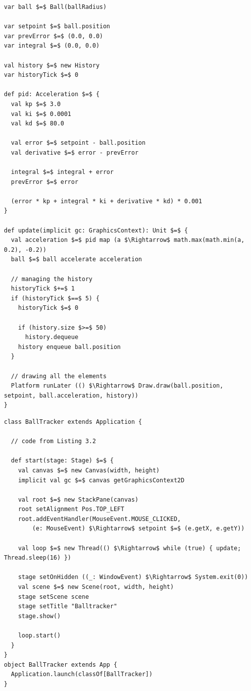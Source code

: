 \begin{minipage}{\linewidth}
\begin{lstlisting}[style=ScalaStyle, caption={Ball drawing}, label={lst:ball-feedback}]
var ball $=$ Ball(ballRadius)

var setpoint $=$ ball.position
var prevError $=$ (0.0, 0.0)
var integral $=$ (0.0, 0.0)

val history $=$ new History
var historyTick $=$ 0

def pid: Acceleration $=$ {
  val kp $=$ 3.0
  val ki $=$ 0.0001
  val kd $=$ 80.0

  val error $=$ setpoint - ball.position
  val derivative $=$ error - prevError

  integral $=$ integral + error
  prevError $=$ error

  (error * kp + integral * ki + derivative * kd) * 0.001
}

def update(implicit gc: GraphicsContext): Unit $=$ {
  val acceleration $=$ pid map (a $\Rightarrow$ math.max(math.min(a, 0.2), -0.2))
  ball $=$ ball accelerate acceleration

  // managing the history
  historyTick $+=$ 1
  if (historyTick $==$ 5) {
    historyTick $=$ 0

    if (history.size $>=$ 50)
      history.dequeue
    history enqueue ball.position
  }

  // drawing all the elements
  Platform runLater (() $\Rightarrow$ Draw.draw(ball.position, setpoint, ball.acceleration, history))
}
\end{lstlisting}
\end{minipage}

\begin{minipage}{\linewidth}
\begin{lstlisting}[style=ScalaStyle, caption={Ball drawing}, label={lst:ball-drawing}]
class BallTracker extends Application {

  // code from Listing 3.2

  def start(stage: Stage) $=$ {
    val canvas $=$ new Canvas(width, height)
    implicit val gc $=$ canvas getGraphicsContext2D

    val root $=$ new StackPane(canvas)
    root setAlignment Pos.TOP_LEFT
    root.addEventHandler(MouseEvent.MOUSE_CLICKED,
        (e: MouseEvent) $\Rightarrow$ setpoint $=$ (e.getX, e.getY))

    val loop $=$ new Thread(() $\Rightarrow$ while (true) { update; Thread.sleep(16) })

    stage setOnHidden ((_: WindowEvent) $\Rightarrow$ System.exit(0))
    val scene $=$ new Scene(root, width, height)
    stage setScene scene
    stage setTitle "Balltracker"
    stage.show()

    loop.start()
  }
}
object BallTracker extends App {
  Application.launch(classOf[BallTracker])
}
\end{lstlisting}
\end{minipage}
